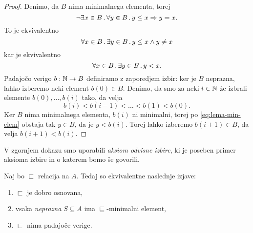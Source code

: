 \begin{proof}
  Denimo, da $B$ nima minimalnega elementa, torej
  \begin{equation*}
    \lnot \exists x \in B \,.\, \forall y \in B \,.\, y \leq x \Rightarrow y = x.
  \end{equation*}
  To je ekvivalentno
  \begin{equation*}
    \forall x \in B \,.\, \exists y \in B \,.\, y \leq x \land y \neq x
  \end{equation*}
  kar je ekvivalentno
  \begin{equation}
    \label{eq:lema-min-elem}
    \forall x \in B \,.\, \exists y \in B \,.\, y < x.
  \end{equation}
  Padajočo verigo $b : \mathbb{N} \to B$ definiramo z zaporedjem izbir: ker je $B$ neprazna, lahko izberemo
  neki element $b(0) \in B$. Denimo, da smo za neki $i \in \mathbb{N}$ že izbrali elemente $b(0), \ldots, b(i)$
  tako, da velja
  \begin{equation*}
    b(i) < b(i-1) < \ldots < b(1) < b(0).
  \end{equation*}
  Ker $B$ nima minimalnega elementa, $b(i)$ ni minimalni, torej po \eqref{eq:lema-min-elem} obstaja tak $y \in B$, da je $y < b(i)$. Torej lahko izberemo $b(i+1) \in B$, da velja $b(i+1) < b(i)$.
\end{proof}

\begin{opomba}
  V zgornjem dokazu smo uporabili \emph{aksiom odvisne izbire}, ki je poseben primer
  aksioma izbire in o katerem bomo še govorili.
\end{opomba}

\begin{izrek}
  \label{izr:dobr-osn-iff}
  Naj bo $\sqsubset$ relacija na $A$. Tedaj so ekvivalentne naslednje izjave:
  \begin{enumerate}
  \item \label{it:dobr-osn-1}%
    $\sqsubset$ je dobro osnovana,
  \item \label{it:dobr-osn-2}%
    vsaka \emph{neprazna} $S \subseteq A$ ima $\sqsubseteq$-minimalni element,
  \item \label{it:dobr-osn-3}%
    $\sqsubset$ nima padajoče verige.
  \end{enumerate}
\end{izrek}

